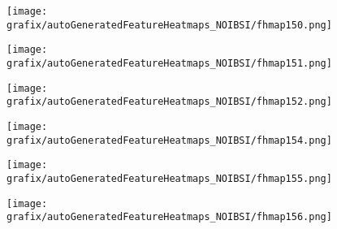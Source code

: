 \hspace{\hsp} 
\begin{subfigure}{\wid\textwidth} 
    \centering 
    \caption{\tiny \sffamily {}} 
    \vspace{\vsp} 
    \texttt{[image: grafix/autoGeneratedFeatureHeatmaps\_NOIBSI/fhmap150.png]} 
\end{subfigure} 
\hspace{\hsp} 
\begin{subfigure}{\wid\textwidth} 
    \centering 
    \caption{\tiny \sffamily {}} 
    \vspace{\vsp} 
    \texttt{[image: grafix/autoGeneratedFeatureHeatmaps\_NOIBSI/fhmap151.png]} 
\end{subfigure} 
\hspace{\hsp} 
\begin{subfigure}{\wid\textwidth} 
    \centering 
    \caption{\tiny \sffamily {}} 
    \vspace{\vsp} 
    \texttt{[image: grafix/autoGeneratedFeatureHeatmaps\_NOIBSI/fhmap152.png]} 
\end{subfigure} 
\hspace{\hsp} 
\begin{subfigure}{\wid\textwidth} 
    \centering 
    \caption{\small \sffamily {}} 
\end{subfigure} 
\hspace{\hsp} 
\begin{subfigure}{\wid\textwidth} 
    \centering 
    \caption{\tiny \sffamily {}} 
    \vspace{\vsp} 
    \texttt{[image: grafix/autoGeneratedFeatureHeatmaps\_NOIBSI/fhmap154.png]} 
\end{subfigure} 
\hspace{\hsp} 
\begin{subfigure}{\wid\textwidth} 
    \centering 
    \caption{\tiny \sffamily {}} 
    \vspace{\vsp} 
    \texttt{[image: grafix/autoGeneratedFeatureHeatmaps\_NOIBSI/fhmap155.png]} 
\end{subfigure} 
\hspace{\hsp} 
\begin{subfigure}{\wid\textwidth} 
    \centering 
    \caption{\tiny \sffamily {}} 
    \vspace{\vsp} 
    \texttt{[image: grafix/autoGeneratedFeatureHeatmaps\_NOIBSI/fhmap156.png]} 
\end{subfigure} 
